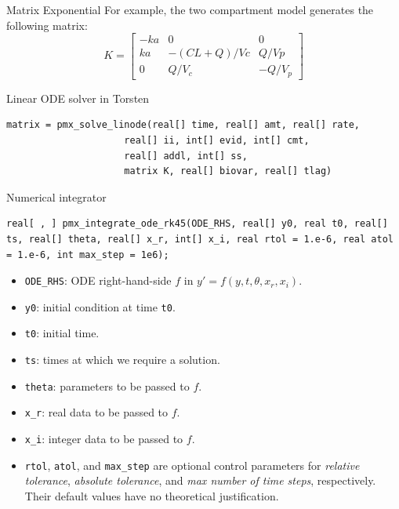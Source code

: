 \documentclass[presentation]{beamer}
\begin{document}
\begin{frame}[label={sec:orgb324e94}]{Matrix Exponential}
For example, the two compartment model generates the following matrix:
\[ K = \begin{bmatrix}
       -ka & 0 & 0 \\
       ka & - (CL + Q) / Vc & Q / Vp \\
       0 & Q / V_c & - Q / V_p
     \end{bmatrix}
  \]
\end{frame}
\begin{frame}[fragile,label={sec:orge27b7b5}]{Linear ODE solver in Torsten}
 \begin{verbatim}
matrix = pmx_solve_linode(real[] time, real[] amt, real[] rate,
                     real[] ii, int[] evid, int[] cmt,
                     real[] addl, int[] ss,
                     matrix K, real[] biovar, real[] tlag)
\end{verbatim}
\end{frame}
\begin{frame}[fragile,label={sec:org2417a39}]{Numerical integrator}
 \begin{verbatim}
real[ , ] pmx_integrate_ode_rk45(ODE_RHS, real[] y0, real t0, real[] ts, real[] theta, real[] x_r, int[] x_i, real rtol = 1.e-6, real atol = 1.e-6, int max_step = 1e6);
\end{verbatim}
\begin{itemize}
\item \texttt{ODE\_RHS}: ODE right-hand-side \(f\) in \(y' = f(y, t, \theta, x_r, x_i)\).
\item \texttt{y0}: initial condition at time \texttt{t0}.
\item \texttt{t0}: initial time.
\item \texttt{ts}: times at which we require a solution.
\item \texttt{theta}: parameters to be passed to \(f\).
\item \texttt{x\_r}: real data to be passed to \(f\).
\item \texttt{x\_i}: integer data to be passed to \(f\).
\item \texttt{rtol}, \texttt{atol}, and \texttt{max\_step} are optional control
parameters for \emph{relative tolerance}, \emph{absolute tolerance}, and \emph{max number of time steps}, respectively. Their default values have no theoretical justification.
\end{itemize}
\end{frame}
\end{document}

